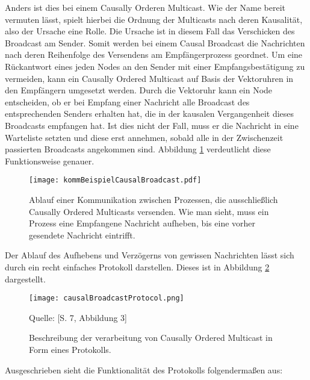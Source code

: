 Anders ist dies bei einem Causally Orderen Multicast. Wie der Name bereit vermuten lässt, spielt hierbei die Ordnung der Multicasts nach deren Kausalität, also der Ursache eine Rolle. Die Ursache ist in diesem Fall das Verschicken des Broadcast am Sender. Somit werden bei einem Causal Broadcast die Nachrichten nach deren Reihenfolge des Versendens am Empfängerprozess geordnet. Um eine Rückantwort eines jeden Nodes an den Sender mit einer Empfangsbestätigung zu vermeiden, kann ein Causally Ordered Multicast auf Basis der Vektoruhren in den Empfängern umgesetzt werden. Durch die Vektoruhr kann ein Node entscheiden, ob er bei Empfang einer Nachricht alle Broadcast des entsprechenden Senders erhalten hat, die in der kausalen Vergangenheit dieses Broadcasts empfangen hat. Ist dies nicht der Fall, muss er die Nachricht in eine Warteliste setzten und diese erst annehmen, sobald alle in der Zwischenzeit passierten Broadcasts angekommen sind. Abbildung \ref{figure:causalbroadcast} verdeutlicht diese Funktionsweise genauer.

\begin{figure}[ht]
	\centering
	\texttt{[image: kommBeispielCausalBroadcast.pdf]}
	\caption[Kommunikation durch Causally Ordered Multicasts]{Ablauf einer Kommunikation zwischen Prozessen, die ausschließlich Causally Ordered Multicasts versenden. Wie man sieht, muss ein Prozess eine Empfangene Nachricht aufheben, bis eine vorher gesendete Nachricht eintrifft.}
	\label{figure:causalbroadcast}
\end{figure}
\FloatBarrier

Der Ablauf des Aufhebens und Verzögerns von gewissen Nachrichten lässt sich durch ein recht einfaches Protokoll darstellen. Dieses ist in Abbildung \ref{figure:causalBroadcastProtocol} dargestellt.

\begin{figure}[ht]
	\centering
	\texttt{[image: causalBroadcastProtocol.png]}
	\caption[Protokoll für den Causally Ordered Multicast]{Beschreibung der verarbeitung von Causally Ordered Multicast in Form eines Protokolls.}
	Quelle: \cite{Baldoni:2002:FDC:1435723.1437765}[S. 7, Abbildung 3]
	\label{figure:causalBroadcastProtocol}
\end{figure}
\FloatBarrier

Ausgeschrieben sieht die Funktionalität des Protokolls folgendermaßen aus:

